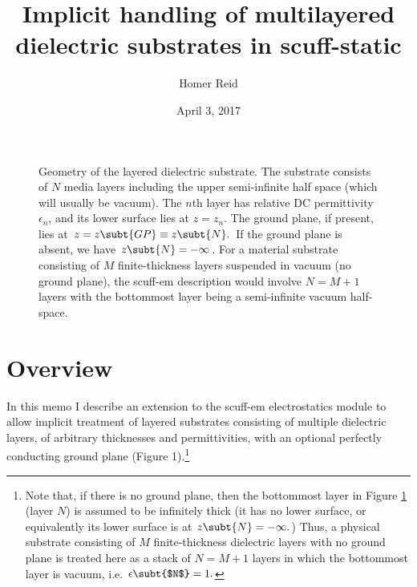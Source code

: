 \documentclass[letterpaper]{article}
\title {Implicit handling of multilayered dielectric substrates 
        in {\sc scuff-static}
       }
\author {Homer Reid}
\date {April 3, 2017}
\begin{document}
\pagestyle{myheadings}
\maketitle

\tableofcontents

\newpage
\begin{figure}
\begin{center}
\caption{Geometry of the layered dielectric substrate. The
substrate consists of $N$ media layers including the upper
semi-infinite half space (which will usually be vacuum).
The $n$th layer
has relative DC permittivity $\epsilon_n$, and its lower surface
lies at $z=z_n$. 
The ground plane, if present, lies at $z=z\subt{GP}\equiv z\subt{N}.$
If the ground plane is absent, we have $z\subt{N}=-\infty$.
For a material substrate consisting of $M$ finite-thickness
layers suspended in vacuum (no ground plane), 
the {\sc scuff-em} description would involve $N=M+1$
layers with the bottommost layer being a semi-infinite vacuum half-space.
}
\label{SubstrateGeometryFigure}
\end{center}
\end{figure}
\section{Overview}

In this memo I describe an extension to the {\sc scuff-em}
electrostatics module to allow implicit treatment of
layered substrates consisting of multiple dielectric layers,
of arbitrary thicknesses and permittivities, with an optional
perfectly conducting ground plane (Figure 1).\footnote{Note 
that, if there is no ground plane, then the bottommost 
layer in Figure \ref{SubstrateGeometryFigure}
(layer $N$) is assumed
to be infinitely thick (it has no lower surface,
or equivalently its lower surface is at $z\subt{N}=-\infty.$)
Thus, a physical 
substrate consisting of $M$ finite-thickness dielectric layers with 
no ground plane is treated here as a stack of $N=M+1$ layers in which
the bottommost layer is vacuum, i.e. $\epsilon\subt{$N$}=1.$}
\end{document}
